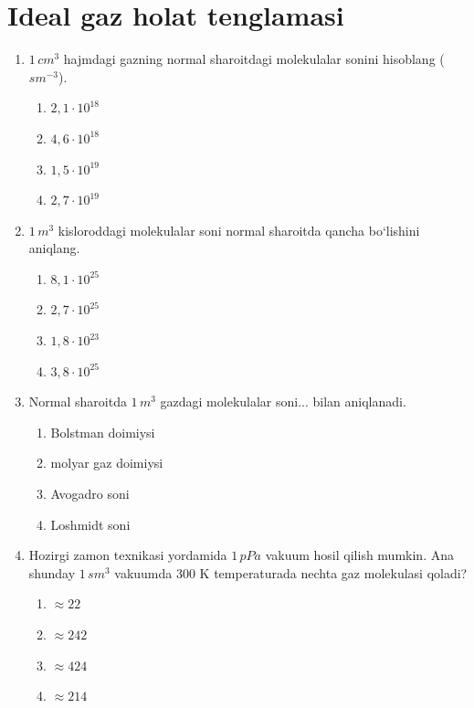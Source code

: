 
\section{Ideal gaz holat tenglamasi}

\begin{enumerate}

\item $1 \, cm^3$ hajmdagi gazning normal sharoitdagi molekulalar sonini hisoblang ($sm^{-3}$).
\begin{enumerate}[label=\Alph*)]
\item $2,1 \cdot 10^{18}$
\item $4,6 \cdot 10^{18}$
\item $1,5 \cdot 10^{19}$
\item $2,7 \cdot 10^{19}$
\end{enumerate}

\item $1 \, m^3$ kisloroddagi molekulalar soni normal sharoitda qancha bo‘lishini aniqlang.
\begin{enumerate}[label=\Alph*)]
\item $8,1 \cdot 10^{25}$
\item $2,7 \cdot 10^{25}$
\item $1,8 \cdot 10^{23}$
\item $3,8 \cdot 10^{25}$
\end{enumerate}

\item Normal sharoitda $1 \, m^3$ gazdagi molekulalar soni... bilan aniqlanadi.
\begin{enumerate}[label=\Alph*)]
\item Bolstman doimiysi
\item molyar gaz doimiysi
\item Avogadro soni
\item Loshmidt soni
\end{enumerate}

\item Hozirgi zamon texnikasi yordamida $1 \, pPa$ vakuum hosil qilish mumkin. Ana shunday $1 \, sm^3$ vakuumda 300 K temperaturada nechta gaz molekulasi qoladi?
\begin{enumerate}[label=\Alph*)]
\item $\approx 22$
\item $\approx 242$
\item $\approx 424$
\item $\approx 214$
\end{enumerate}


\end{enumerate}
